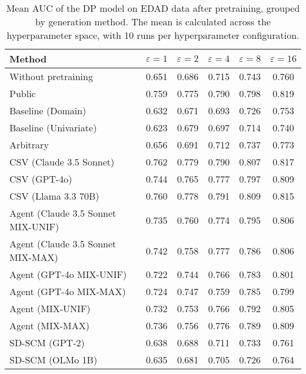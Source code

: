 \begin{table}[h!]
    \centering
    \caption{Mean AUC of the DP model on EDAD data after pretraining, grouped by generation method. The mean is calculated across the hyperparameter space, with 10 runs per hyperparameter configuration.}
    \label{tab:epsilon_comparison}
    \begin{tabular}{lccccc}
    \toprule
    Method & $\varepsilon=1$ & $\varepsilon=2$ & $\varepsilon=4$ & $\varepsilon=8$ & $\varepsilon=16$ \\
    \midrule
    Without pretraining & 0.651 & 0.686 & 0.715 & 0.743 & 0.760 \\
    \arrayrulecolor{black!50!}\midrule
    Public & \cellcolor{bronze!30}0.759 & \cellcolor{bronze!30}0.775 & \cellcolor{silver!30}0.790 & \cellcolor{bronze!30}0.798 & \cellcolor{gold!30}0.819 \\
    \arrayrulecolor{black!50!}\midrule
    Baseline (Domain) & 0.632 & 0.671 & 0.693 & 0.726 & 0.753 \\
    Baseline (Univariate) & 0.623 & 0.679 & 0.697 & 0.714 & 0.740 \\
    \arrayrulecolor{black!50!}\midrule
    Arbitrary & 0.656 & 0.691 & 0.712 & 0.737 & 0.773 \\
    \arrayrulecolor{black!50!}\midrule
    CSV (Claude 3.5 Sonnet) & \cellcolor{gold!30}0.762 & \cellcolor{gold!30}0.779 & \cellcolor{silver!30}0.790 & \cellcolor{silver!30}0.807 & \cellcolor{silver!30}0.817 \\
    CSV (GPT-4o) & 0.744 & 0.765 & \cellcolor{bronze!30}0.777 & 0.797 & 0.809 \\
    CSV (Llama 3.3 70B) & \cellcolor{silver!30}0.760 & \cellcolor{silver!30}0.778 & \cellcolor{gold!30}0.791 & \cellcolor{gold!30}0.809 & \cellcolor{bronze!30}0.815 \\
    \arrayrulecolor{black!50!}\midrule
    Agent (Claude 3.5 Sonnet MIX-UNIF) & 0.735 & 0.760 & 0.774 & 0.795 & 0.806 \\
    Agent (Claude 3.5 Sonnet MIX-MAX) & 0.742 & 0.758 & \cellcolor{bronze!30}0.777 & 0.786 & 0.806 \\
    Agent (GPT-4o MIX-UNIF) & 0.722 & 0.744 & 0.766 & 0.783 & 0.801 \\
    Agent (GPT-4o MIX-MAX) & 0.724 & 0.747 & 0.759 & 0.785 & 0.799 \\
    Agent (MIX-UNIF) & 0.732 & 0.753 & 0.766 & 0.792 & 0.805 \\
    Agent (MIX-MAX) & 0.736 & 0.756 & 0.776 & 0.789 & 0.809 \\
    \arrayrulecolor{black!50!}\midrule
    SD-SCM (GPT-2) & 0.638 & 0.688 & 0.711 & 0.733 & 0.761 \\
    SD-SCM (OLMo 1B) & 0.635 & 0.681 & 0.705 & 0.726 & 0.764 \\
    \bottomrule
    \end{tabular}
\end{table}